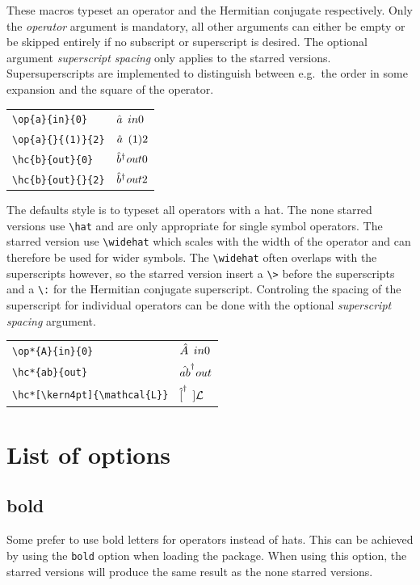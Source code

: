 \documentclass[10pt]{article}
\begin{document}
These macros typeset an operator and the Hermitian conjugate respectively. Only the \emph{operator} argument is mandatory, all other arguments can either be empty or be skipped entirely if no subscript or superscript is desired. The optional argument \emph{superscript spacing} only applies to the starred versions. Supersuperscripts are implemented to distinguish between e.g.\ the order in some expansion and the square of the operator.

\begin{table}[H]
	\centering
	\begin{tabular}{ll}
		\verb|\op{a}{in}{0}| & $\op{a}{in}{0}$ \\
		\verb|\op{a}{}{(1)}{2}| & $\op{a}{}{(1)}{2}$ \\
		\verb|\hc{b}{out}{0}| & $\hc{b}{out}{0}$ \\
		\verb|\hc{b}{out}{}{2}| & $\hc{b}{out}{}{2}$ 
	\end{tabular}
\end{table}

The defaults style is to typeset all operators with a hat. The none starred versions use \verb|\hat| and are only appropriate for single symbol operators. The starred version use \verb|\widehat| which scales with the width of the operator and can therefore be used for wider symbols. The \verb|\widehat| often overlaps with the superscripts however, so the starred version insert a \verb|\>| before the superscripts and a \verb|\:| for the Hermitian conjugate superscript. Controling the spacing of the superscript for individual operators can be done with the optional \emph{superscript spacing} argument.

\begin{table}[H]
	\centering
	\begin{tabular}{ll}
		\verb|\op*{A}{in}{0}| & $\op*{A}{in}{0}$ \\
		\verb|\hc*{ab}{out}| & $\hc*{ab}{out}$ \\
		\verb|\hc*[\kern4pt]{\mathcal{L}}| & $\hc*[\kern4pt]{\mathcal{L}}$ 
	\end{tabular}
\end{table}


\section{List of options}
\subsection{bold}
Some prefer to use bold letters for operators instead of hats. This can be achieved by using the \texttt{bold} option when loading the package. When using this option, the starred versions will produce the same result as the none starred versions.
\end{document}
